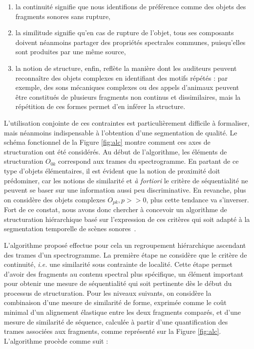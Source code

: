 \begin{enumerate}
  \item la continuité signifie que nous identifions de préférence comme des objets des fragments sonores sans rupture,
  \item la similitude signifie qu'en cas de rupture de l'objet, tous ses composants doivent néanmoins partager des propriétés spectrales communes, puisqu'elles sont produites par une même source,
  \item la notion de  structure, enfin, reflète la manière dont les auditeurs peuvent reconnaître des objets complexes en identifiant des motifs répétés : par exemple, des sons mécaniques complexes ou des appels d'animaux peuvent être constitués de plusieurs fragments non continus et dissimilaires, mais la répétition de ces formes permet d'en inférer la structure.
\end{enumerate}


L'utilisation conjointe de ces contraintes est particulièrement difficile à formaliser, mais néanmoins indispensable à l'obtention d'une segmentation de qualité. Le schéma fonctionnel de la Figure \ref{fig:alc} montre comment ces axes de structuration ont été considérés. Au début de l'algorithme, les éléments de structuration $O_{0 k}$ correspond aux trames du spectrogramme. En partant de ce type d'objets élémentaires, il est évident que la notion de proximité doit prédominer, car les notions de similarité et \textit{à fortiori} le critère de séquentialité ne peuvent se baser sur une information aussi peu discriminative.  En revanche, plus on considère des objets complexes $O_{p k}, p >> 0$, plus cette tendance va s'inverser. Fort de ce constat, nous avons donc chercher à concevoir un algorithme de structuration hiérarchique basé sur l'expression de ces critères qui soit adapté à la segmentation temporelle de scènes sonores~\cite{rossignolhal-01122006}.

L'algorithme proposé effectue pour cela un regroupement hiérarchique ascendant des trames d'un spectrogramme. La première étape ne considère que le  critère de continuité, \textit{i.e.} une similarité sous contrainte de localité. Cette étape permet d'avoir des fragments au contenu spectral plus spécifique, un élément important pour obtenir une mesure de séquentialité qui soit pertinente dès le début du processus de structuration. Pour les niveaux suivants, on considère la combinaison d'une mesure de similarité de forme, exprimée comme le coût minimal d'un alignement élastique entre les deux fragments comparés, et d'une mesure de similarité de séquence, calculée à partir d'une quantification des trames associées aux fragments, comme représenté sur la Figure \ref{fig:alc}. L'algorithme procède comme suit :

